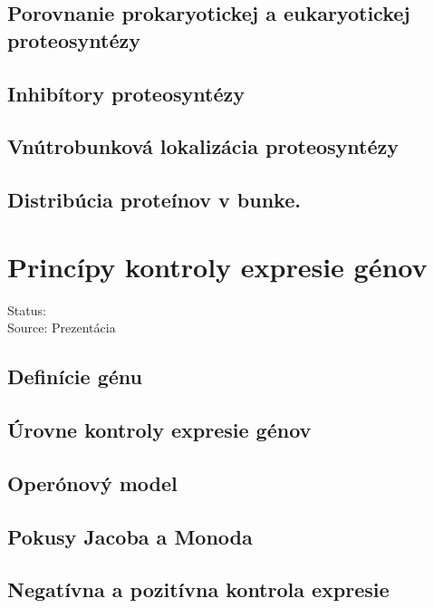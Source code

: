 \subsection*{Porovnanie prokaryotickej a eukaryotickej proteosyntézy}

\subsection*{Inhibítory proteosyntézy}

\subsection*{Vnútrobunková lokalizácia proteosyntézy}

\subsection*{Distribúcia proteínov v bunke.}

\section{Princípy kontroly expresie génov}

Status: \\
Source: Prezentácia \\

\subsection*{Definície génu}

\subsection*{Úrovne kontroly expresie génov}

\subsection*{Operónový model}

\subsection*{Pokusy Jacoba a Monoda}

\subsection*{Negatívna a pozitívna kontrola expresie}

